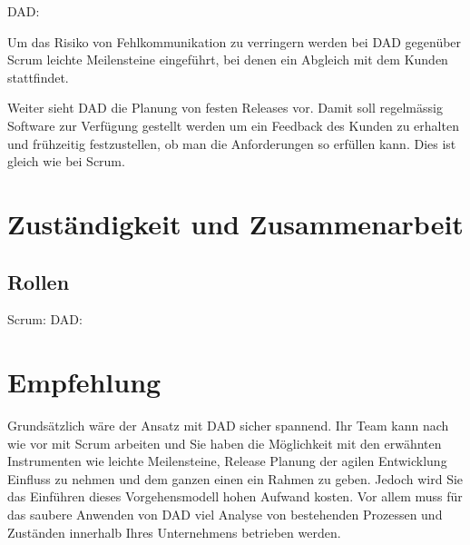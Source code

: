 \bigskip 

{\Large DAD:} \medskip

Um das Risiko von Fehlkommunikation zu verringern werden bei DAD gegenüber Scrum leichte Meilensteine eingeführt, bei denen ein Abgleich mit dem Kunden stattfindet. \medskip

Weiter sieht DAD die Planung von festen Releases vor. Damit soll regelmässig Software zur Verfügung gestellt werden um ein Feedback des Kunden zu erhalten und frühzeitig festzustellen, ob man die Anforderungen so erfüllen kann. Dies ist gleich wie bei Scrum.

\section{Zuständigkeit und Zusammenarbeit}
\subsection{Rollen}
{\Large Scrum:} \medskip
{\Large DAD:} \medskip


\section{Empfehlung}

Grundsätzlich wäre der Ansatz mit DAD sicher spannend. Ihr Team kann nach wie vor mit Scrum arbeiten und Sie haben die Möglichkeit mit den erwähnten Instrumenten wie leichte Meilensteine, Release Planung der agilen Entwicklung Einfluss zu nehmen und dem ganzen einen ein Rahmen zu geben. \newline
Jedoch wird Sie das Einführen dieses Vorgehensmodell hohen Aufwand kosten. Vor allem muss für das saubere Anwenden von DAD viel Analyse von bestehenden Prozessen und Zuständen innerhalb Ihres Unternehmens betrieben werden.



	